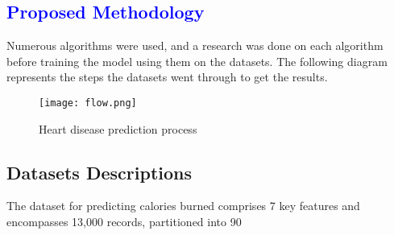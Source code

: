\documentclass[conference]{IEEEtran}
\newcommand{\mar}[1]{\textcolor{blue}{#1}}
\begin{document}

 \mar{\section{\textbf{\large Proposed Methodology}}}
\label{methodo}
Numerous algorithms were used, and a research was done on each algorithm before training the model using them on the datasets. The following diagram represents the steps the datasets went through to get the results.

\begin{figure}[H]
\texttt{[image: flow.png]}
\caption{Heart disease prediction process}
\label{predprocess} 
\end{figure}    

\subsection{\textbf{\large Datasets Descriptions}}

The dataset for predicting calories burned comprises 7 key features and encompasses 13,000 records, partitioned into 90%
\end{document}
